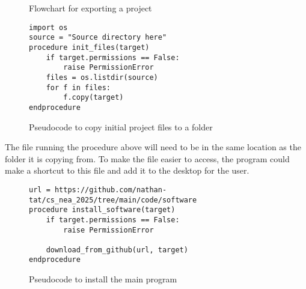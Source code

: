         \begin{figure}[!ht]
            \centering
            \caption{Flowchart for exporting a project}
            \label{flow:flowchart_design_c1}
        \end{figure}
        

        \begin{figure}[!ht]
            \begin{verbatim}
import os
source = "Source directory here"
procedure init_files(target)
    if target.permissions == False:
        raise PermissionError
    files = os.listdir(source)
    for f in files:
        f.copy(target)
endprocedure
            \end{verbatim}
            \caption{Pseudocode to copy initial project files to a folder}
            \label{pc:copy_to_folder_ps_c1}
        \end{figure}


        The file running the procedure above will need to be in the same location as the folder it is copying from. To make the file easier to access, the program could make a shortcut to this file and add it to the desktop for the user.
        

        \begin{figure}[!ht]
            \begin{verbatim}
url = https://github.com/nathan-tat/cs_nea_2025/tree/main/code/software
procedure install_software(target)
    if target.permissions == False:
        raise PermissionError

    download_from_github(url, target)
endprocedure
            \end{verbatim}
            \caption{Pseudocode to install the main program}
            \label{pc:install_software_ps_c1}
        \end{figure}


